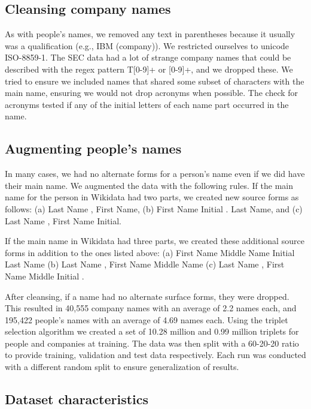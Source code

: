 \subsection{Cleansing company names}
As with people's names, we removed any text in parentheses because it usually was a qualification (e.g., IBM (company)).  We restricted ourselves to unicode ISO-8859-1.  The SEC data had a lot of strange company names that could be described with the regex pattern T[0-9]+ or [0-9]+, and we dropped these.  We tried to ensure we included names that shared some subset of characters with the main name, ensuring we would not drop acronyms when possible.  The check for acronyms tested if any of the initial letters of each name part occurred in the name.

\subsection{Augmenting people's names}
In many cases, we had no alternate forms for a person's name even if we did have their main name.  We augmented the data with the following rules.  If the main name for the person in Wikidata had two parts, we created new source forms as follows: (a) Last Name , First Name, (b) First Name Initial . Last Name, and (c) Last Name , First Name Initial.

If the main name in Wikidata had three parts, we created these additional source forms in addition to the ones listed above: (a) First Name Middle Name Initial Last Name (b) Last Name , First Name Middle Name (c) Last Name , First Name Middle Initial .

After cleansing, if a name had no alternate surface forms, they were dropped.  This resulted in 40,555 company names with an average of 2.2 names each, and 195,422 people's names with an average of 4.69 names each.  Using the triplet selection algorithm we created a set of 10.28 million and 0.99 million triplets for people and companies at training.  The data was then split with a 60-20-20 ratio to provide training, validation and test data respectively.  Each run was conducted with a different random split to ensure generalization of results.

\subsection{Dataset characteristics}

